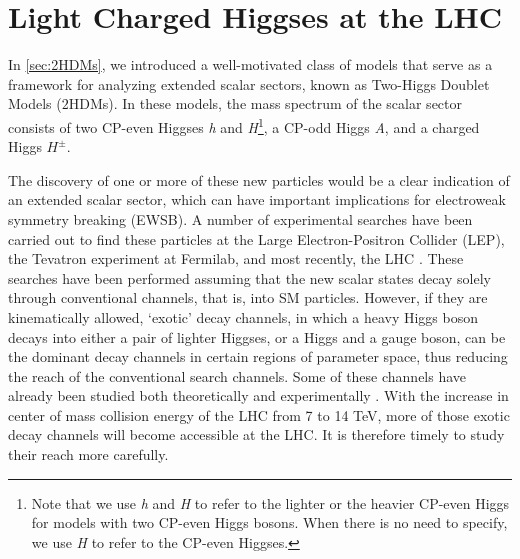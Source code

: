 \chapter{Light Charged Higgses at the LHC}\label{ch:LightChargedHiggs}

\def\h{h}
\def\H{H}
\def\A{A}
\newcommand{\sba}{\ensuremath{s_{\beta-\alpha}}}
\newcommand{\cba}{\ensuremath{\cos(\beta-\alpha)}}
\newcommand{\met}{\ensuremath{{\not\mathrel{E}}_T}}
\newcommand{\ifb}{\ensuremath{ \text{fb}^{-1} }}
\newcommand{\cmark}{\ding{51}}%
\newcommand{\xmark}{\ding{55}}%

In \autoref{sec:2HDMs}, we introduced a well-motivated class of models that serve as a framework for analyzing extended scalar sectors, known as Two-Higgs Doublet Models ($2$HDMs). In these models, the mass spectrum of the scalar sector consists of two CP-even Higgses \emph{h} and \emph{H}\footnote{Note that we use \emph{h} and \emph{H} to refer to the lighter or the heavier CP-even Higgs for models with two CP-even Higgs bosons. When there is no need to specify, we use \emph{H} to refer to the CP-even Higgses.}, a CP-odd Higgs \emph{A}, and a charged Higgs $H^\pm$. 

The discovery of one or more of these new particles would be a clear indication of an extended scalar sector, which can have important implications for electroweak symmetry breaking (EWSB). A number of experimental searches have been carried out to find these particles at the Large Electron-Positron Collider (LEP), the Tevatron experiment at Fermilab, and most recently, the LHC \cite{LEP_Higgs, Aad:2014vgg, Khachatryan:2014wca, TheATLAScollaboration:2013wia, CMS:2014cdp, Aad:2013hla, CMS:2014kga, Khachatryan:2015cwa}. These searches have been performed assuming that the new scalar states decay solely through conventional channels, that is, into SM particles. However, if they are kinematically allowed, `exotic' decay channels, in which a heavy Higgs boson decays into either a pair of lighter Higgses, or a Higgs and a gauge boson, can be the dominant decay channels in certain regions of parameter space, thus reducing the reach of the conventional search channels. Some of these channels have already been studied both theoretically \cite{Curtin:2013fra, Brownson:2013lka, Coleppa:2014hxa, Coleppa:2014cca,Li:2015lra,Dorsch:2014qja,Chen:2013emb,Chen:2014dma,Enberg:2014pua} and experimentally \cite{Aad:2015wra, CMS:2014yra,CMS:2013eua}. With the increase in center of mass collision energy of the LHC from 7 to 14 TeV, more of those exotic decay channels will become accessible at the LHC. It is therefore timely to study their reach more carefully.

